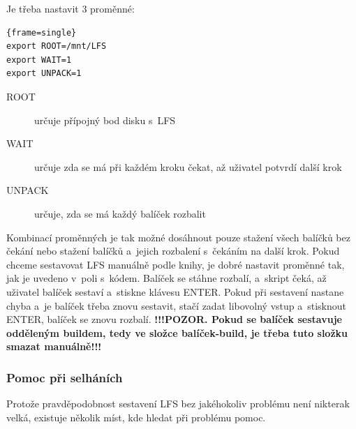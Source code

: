 \documentclass[a4paper,12pt]{article}
\renewcommand{\b}[1]{\textbf{#1}} %
\newenvironment{codeframe}{%
  \begin{Sbox} 
    \begin{minipage} 
      {\columnwidth-\leftmargin-\rightmargin-2\fboxsep-2\fboxrule-4pt} 
}{%

  \end{minipage} 
  \end{Sbox} 
  \begin{center} 
    \fcolorbox{black}{codeback}{\TheSbox} 
  \end{center} 
}
\begin{document}
Je třeba nastavit 3 proměnné:
    \begin{codeframe} 
\begin{Verbatim}{frame=single} 
export ROOT=/mnt/LFS
export WAIT=1
export UNPACK=1
\end{Verbatim} 
    \end{codeframe}
\begin{description}
 \item[ROOT] určuje přípojný bod disku s~LFS
 \item[WAIT] určuje zda se má při každém kroku čekat, až uživatel potvrdí další krok
 \item[UNPACK] určuje, zda se má každý balíček rozbalit
\end{description}
Kombinací proměnných je tak možné dosáhnout pouze stažení všech balíčků bez čekání nebo stažení balíčků a~jejich rozbalení s~čekáním na další krok. Pokud chceme sestavovat LFS manuálně podle knihy, je dobré nastavit proměnné tak, jak je uvedeno v~poli s~kódem. Balíček se stáhne rozbalí, a~skript čeká, až uživatel balíček sestaví a~stiskne klávesu ENTER. Pokud při sestavení nastane chyba a~je balíček třeba znovu sestavit, stačí zadat libovolný vstup a~stisknout ENTER, balíček se znovu rozbalí. \b{!!!POZOR. Pokud se balíček sestavuje odděleným buildem, tedy ve složce balíček-build, je třeba tuto složku smazat manuálně!!!}

\subsubsection{Pomoc při selháních}\label{sec:help}
Protože pravděpodobnost sestavení LFS bez jakéhokoliv problému není nikterak velká, existuje několik míst, kde hledat při problému pomoc.
\end{document}
